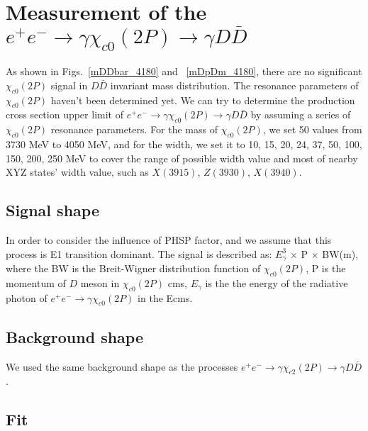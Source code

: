 \documentclass[aps,preprint,tightenlines,superscriptaddress,showpacs,byrevtex,amsmath,amssymb,nofloatfix]{revtex4}
\begin{document}
\section{Measurement of the $e^{+}e^{-}\rightarrow \gamma \chi_{c0} (2P)\rightarrow \gamma D\bar{D}$}

As shown in Figs.~\ref{mDDbar_4180} and ~\ref{mDpDm_4180}, there are no significant  $\chi_{c0} (2P)$ signal in $D\bar{D}$ invariant mass distribution. The resonance parameters of $\chi_{c0} (2P)$ haven't been determined yet. We can try to determine the production cross section upper limit of  $e^{+}e^{-}\rightarrow \gamma \chi_{c0} (2P)\rightarrow \gamma D\bar{D}$ by assuming a series of $\chi_{c0} (2P)$ resonance parameters. For the mass of $\chi_{c0} (2P)$, we set 50 values from 3730 MeV to 4050 MeV, and for the width, we set it to 10, 15, 20, 24, 37, 50, 100, 150, 200, 250 MeV to cover the range of possible width value and most of nearby XYZ states' width value, such as $X(3915)$, $Z(3930)$, $X(3940)$.

\subsection{Signal shape}

In order to consider the influence of PHSP factor, and we assume that this process is E1 transition dominant. The signal is described as: $E_{\gamma}^{3}$ $\times$ P $\times$ BW(m), where the BW is the Breit-Wigner distribution function of $\chi_{c0} (2P)$, P is the momentum of $D$ meson  in  $\chi_{c0} (2P)$ cms, $E_{\gamma}$ is the the energy of the radiative photon of $e^{+}e^{-}\rightarrow \gamma \chi_{c0} (2P)$ in the Ecms.

\subsection{Background shape}

We used the same background shape as the processes $e^{+}e^{-}\rightarrow \gamma \chi_{c2} (2P)\rightarrow \gamma D\bar{D}$.

\subsection{Fit}
\end{document}
